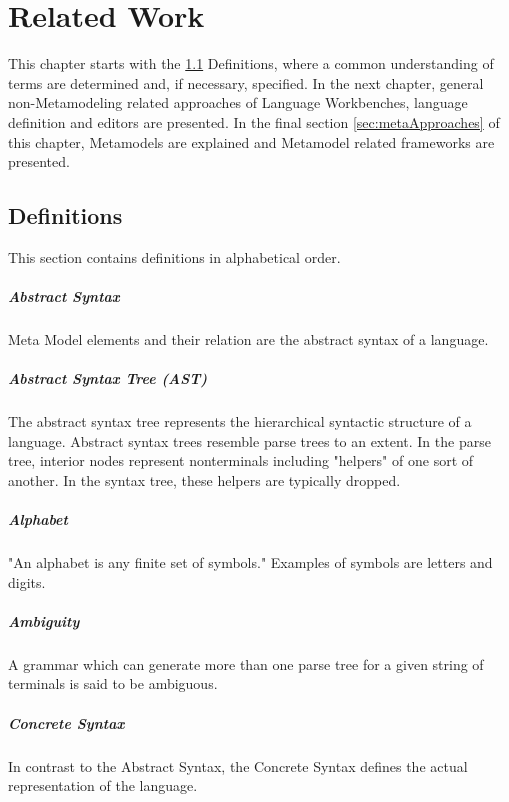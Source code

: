 \chapter{Related Work}
This chapter starts with the \ref{sec:def} Definitions, where a common understanding of terms are determined and, if necessary, specified. In the next chapter, general non-Metamodeling related approaches of Language Workbenches, language definition and editors are presented. In the final section \ref{sec:metaApproaches} of this chapter, Metamodels are explained and Metamodel related frameworks are presented.

\section{Definitions} \label{sec:def}
This section contains definitions in alphabetical order. 
\paragraph{Abstract Syntax} Meta Model elements and their relation are the abstract syntax of a language. \cite{MDSD}

\paragraph{Abstract Syntax Tree (AST)}  
The abstract syntax tree represents the hierarchical syntactic structure of a language.  Abstract syntax trees resemble parse trees to an extent. In the parse tree, interior nodes represent nonterminals including "helpers" of one sort of another. In the syntax tree, these helpers are typically dropped. \cite{DragonBook}

\paragraph{Alphabet}
"An alphabet is any finite set of symbols." Examples of symbols are letters and digits. \cite{DragonBook}


\paragraph{Ambiguity} 
A grammar which can generate more than one parse tree for a given string of terminals is said to be ambiguous.\cite{DragonBook}

 
\paragraph{Concrete Syntax} In contrast to the Abstract Syntax, the Concrete Syntax defines the actual representation of the language. \cite{MDSD}

